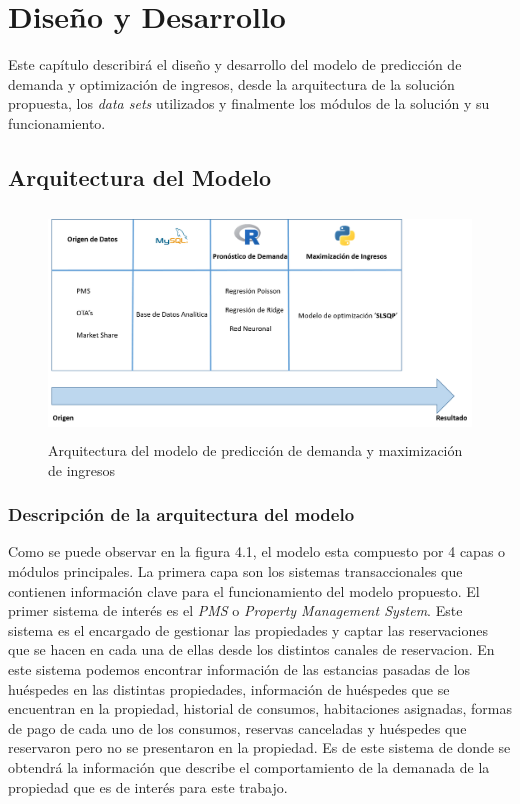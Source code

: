 \chapter{Diseño y Desarrollo}
\label{ch:modelo}

Este capítulo describirá el diseño y desarrollo del modelo de predicción de demanda y optimización de ingresos, desde la arquitectura de la solución propuesta, los \emph{data sets} utilizados y finalmente los módulos de la solución y su funcionamiento.

\section*{Arquitectura del Modelo}

\begin{figure}[H]
  \centering
      \includegraphics[width=\maxwidth,height=6cm]{figures/Arquitectura.png}  
  \caption{Arquitectura del modelo de predicción de demanda y maximización de ingresos}
\end{figure}

\subsection*{Descripción de la arquitectura del modelo}

Como se puede observar en la figura 4.1, el modelo esta compuesto por 4 capas o módulos principales. La primera capa son los sistemas transaccionales que contienen información clave para el funcionamiento del modelo propuesto. El primer sistema de interés es el \emph{PMS} o \emph{Property Management System}. Este sistema es el encargado de gestionar las propiedades y captar las reservaciones que se hacen en cada una de ellas desde los distintos canales de reservacion. En este sistema podemos encontrar información de las estancias pasadas de los huéspedes en las distintas propiedades, información de huéspedes que se encuentran en la propiedad, historial de consumos, habitaciones asignadas, formas de pago de cada uno de los consumos, reservas canceladas y huéspedes que reservaron pero no se presentaron en la propiedad. Es de este sistema de donde se obtendrá la información que describe el comportamiento de la demanada de la propiedad que es de interés para este trabajo.

